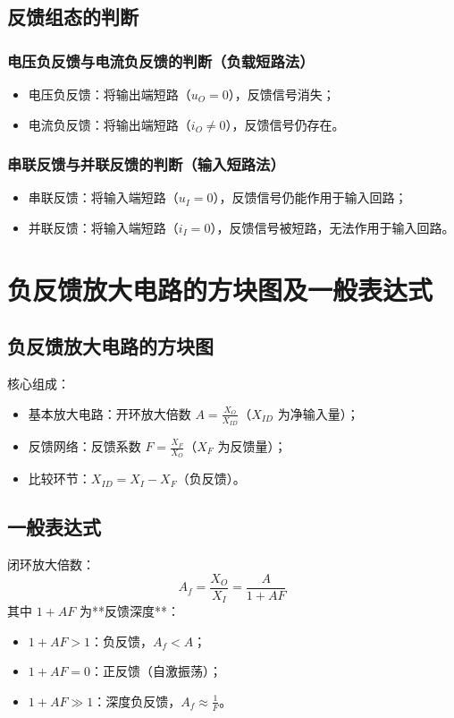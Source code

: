 \subsection{反馈组态的判断}
\subsubsection{电压负反馈与电流负反馈的判断（负载短路法）}
\begin{itemize}
    \item 电压负反馈：将输出端短路（$u_O=0$），反馈信号消失；
    \item 电流负反馈：将输出端短路（$i_O \neq 0$），反馈信号仍存在。
\end{itemize}

\subsubsection{串联反馈与并联反馈的判断（输入短路法）}
\begin{itemize}
    \item 串联反馈：将输入端短路（$u_I=0$），反馈信号仍能作用于输入回路；
    \item 并联反馈：将输入端短路（$i_I=0$），反馈信号被短路，无法作用于输入回路。
\end{itemize}

\section{负反馈放大电路的方块图及一般表达式}
\subsection{负反馈放大电路的方块图}
核心组成：
\begin{itemize}
    \item 基本放大电路：开环放大倍数 $A = \frac{X_O}{X_{ID}}$（$X_{ID}$ 为净输入量）；
    \item 反馈网络：反馈系数 $F = \frac{X_F}{X_O}$（$X_F$ 为反馈量）；
    \item 比较环节：$X_{ID} = X_I - X_F$（负反馈）。
\end{itemize}

\subsection{一般表达式}
闭环放大倍数：
\[
A_f = \frac{X_O}{X_I} = \frac{A}{1 + AF}
\]
其中 $1 + AF$ 为**反馈深度**：
\begin{itemize}
    \item $1 + AF > 1$：负反馈，$A_f < A$；
    \item $1 + AF = 0$：正反馈（自激振荡）；
    \item $1 + AF \gg 1$：深度负反馈，$A_f \approx \frac{1}{F}$。
\end{itemize}

